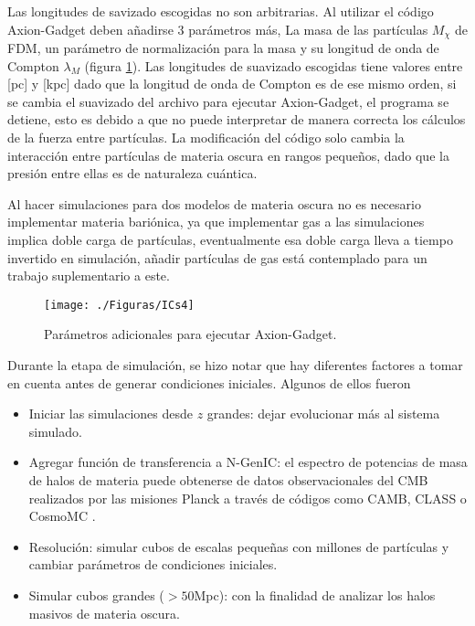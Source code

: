\documentclass[a4paper,openright,12pt]{book}
\begin{document}
Las longitudes de savizado escogidas no son arbitrarias. Al utilizar el código Axion-Gadget deben añadirse 3 parámetros más, La masa de las partículas $M_{\chi}$ de FDM, un parámetro de normalización para la masa y su longitud de onda de Compton $\lambda_{M}$ (figura \ref{fig 4.2}). Las longitudes de suavizado escogidas tiene valores entre [pc] y [kpc] dado que la longitud de onda de Compton es de ese mismo orden, si se cambia el suavizado del archivo para ejecutar Axion-Gadget, el programa se detiene, esto es debido a que no puede interpretar de manera correcta los cálculos de la fuerza entre partículas. La modificación del código solo cambia la interacción entre partículas de materia oscura en rangos pequeños, dado que la presión entre ellas es de naturaleza cuántica.

Al hacer simulaciones para dos modelos de materia oscura no es necesario implementar materia bariónica, ya que implementar gas a las simulaciones implica doble carga de partículas, eventualmente esa doble carga lleva a tiempo invertido en simulación, añadir partículas de gas está contemplado para un trabajo suplementario a este.

\begin{figure}
\centering \texttt{[image: ./Figuras/ICs4]}
\caption{\footnotesize{Parámetros adicionales para ejecutar Axion-Gadget.}}
\label{fig 4.2}
\end{figure}




Durante la etapa de simulación, se hizo notar que hay diferentes factores a tomar en cuenta antes de generar condiciones iniciales. Algunos de ellos fueron
\begin{itemize}
\item Iniciar las simulaciones desde $z$ grandes: dejar evolucionar más al sistema simulado.
\item Agregar función de transferencia a N-GenIC: el espectro de potencias de masa de halos de materia puede obtenerse de datos observacionales del CMB realizados por las misiones Planck a través de códigos como CAMB, CLASS o CosmoMC \cite{4.3.1, 4.3.2}.
\item Resolución: simular cubos de escalas pequeñas con millones de partículas y cambiar parámetros de condiciones iniciales.
\item Simular cubos grandes ($> 50 $Mpc): con la finalidad de analizar los halos masivos de materia oscura.
\end{itemize}
\end{document}
